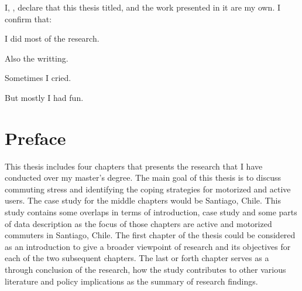 \documentclass[
11pt, %
oneside, %
english, %
singlespacing, %
]{macthesis} %
\begin{document}
\begin{declaration}
\addchaptertocentry{\authorshipname}

\noindent I, \authorname, declare that this thesis titled, \emph{\ttitle} and the work presented in it are my own. I confirm that:

I did most of the research.

Also the writting.

Sometimes I cried.

But mostly I had fun.

\end{declaration}

\label{lastoffront}
\clearpage


\mainmatter %
\pagestyle{thesis}
\hypertarget{preface}{%
\chapter*{Preface}\label{preface}}

This thesis includes four chapters that presents the research that I have conducted over my master's degree. The main goal of this thesis is to discuss commuting stress and identifying the coping strategies for motorized and active users. The case study for the middle chapters would be Santiago, Chile. This study contains some overlaps in terms of introduction, case study and some parts of data description as the focus of those chapters are active and motorized commuters in Santiago, Chile. The first chapter of the thesis could be considered as an introduction to give a broader viewpoint of research and its objectives for each of the two subsequent chapters. The last or forth chapter serves as a through conclusion of the research, how the study contributes to other various literature and policy implications as the summary of research findings.
\end{document}
